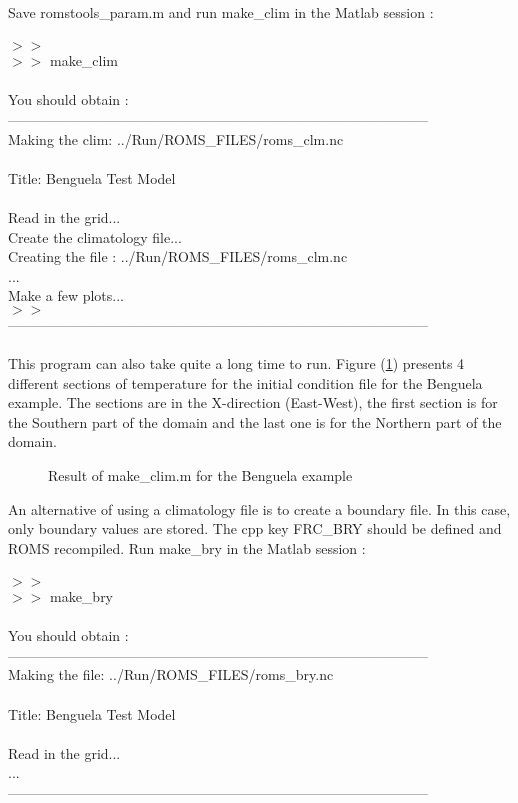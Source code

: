 Save romstools\_param.m and run make\_clim in the Matlab session :
\\ \\
$>>$\\
$>>$ make\_clim \\\\
You should obtain :\\
------------------------------------------------------------------------------------------\\
 Making the clim: ../Run/ROMS\_FILES/roms\_clm.nc \\
 \\
 Title: Benguela Test Model \\
 \\
 Read in the grid...
 \\
 Create the climatology file... \\
 Creating the file : ../Run/ROMS\_FILES/roms\_clm.nc\\
 ...\\ 
 Make a few plots...\\ 
 $>>$\\
------------------------------------------------------------------------------------------\\\\
This program can also take quite a long time to run.
Figure (\ref{fig:clim}) presents 4 different sections
of temperature for the initial condition file for the 
Benguela example. The sections are in the X-direction (East-West), 
the first section is for the Southern part of the domain and the last one 
is for the Northern part of the domain.
\begin{figure}[h!]
\centerline{}
\caption{Result of make\_clim.m for the Benguela example}
\label{fig:clim}
\end{figure}

An alternative of using a climatology file is to create a boundary 
file. In this case, only boundary values are stored. The cpp key
FRC\_BRY should be defined and ROMS recompiled. Run make\_bry in 
the Matlab session :
\\ \\
$>>$\\
$>>$ make\_bry \\\\
You should obtain :\\
------------------------------------------------------------------------------------------\\
 Making the file: ../Run/ROMS\_FILES/roms\_bry.nc \\
 \\
 Title: Benguela Test Model \\
 \\
 Read in the grid... \\
... \\
------------------------------------------------------------------------------------------\\


